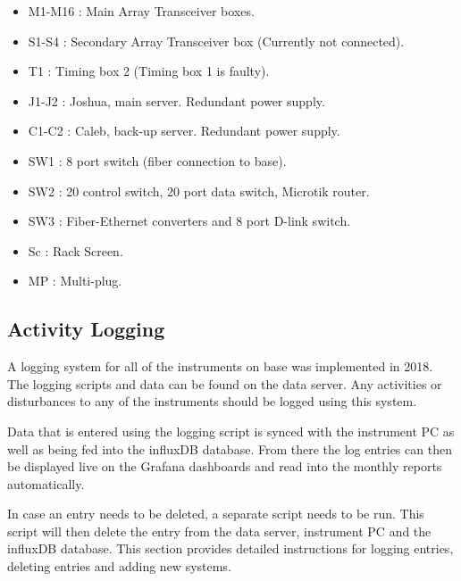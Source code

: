 \par
\begin{itemize}
	\item M1-M16 : Main Array Transceiver boxes.
	\item S1-S4 : Secondary Array Transceiver box (Currently not connected).
	\item T1 : Timing box 2 (Timing box 1 is faulty).
	\item J1-J2 : Joshua, main server. Redundant power supply.
	\item C1-C2 : Caleb, back-up server. Redundant power supply.
	\item SW1 : 8 port switch (fiber connection to base).
	\item SW2 : 20 control switch, 20 port data switch, Microtik router.
	\item SW3 : Fiber-Ethernet converters and 8 port D-link switch.
	\item Sc : Rack Screen.
	\item MP : Multi-plug.
\end{itemize}

\clearpage

\subsection{Activity Logging}
\label{subsec:ops_logging}
A logging system for all of the instruments on base was implemented in 2018. The logging scripts and data can be found on the data server. Any activities or disturbances to any of the instruments should be logged using this system.
\par
Data that is entered using the logging script is synced with the instrument PC as well as being fed into the influxDB database. From there the log entries can then be displayed live on the Grafana dashboards and read into the monthly reports automatically.
\par
In case an entry needs to be deleted, a separate script needs to be run. This script will then delete the entry from the data server, instrument PC and the influxDB database. This section provides detailed instructions for logging entries, deleting entries and adding new systems.

